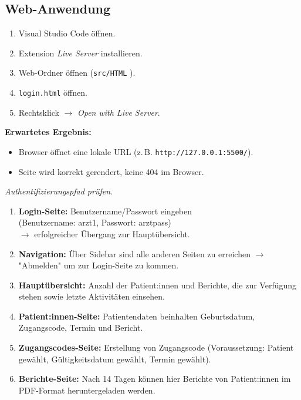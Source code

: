 
\subsection{Web-Anwendung}

\begin{enumerate}
  \item Visual Studio Code öffnen.
  \item Extension \emph{Live Server} installieren.
  \item Web-Ordner öffnen (\texttt{src/HTML} ).
  \item \texttt{login.html} öffnen.
  \item Rechtsklick $\rightarrow$ \emph{Open with Live Server}.
\end{enumerate}

\textbf{Erwartetes Ergebnis:}
\begin{itemize}
  \item Browser öffnet eine lokale URL (z.\,B. \texttt{http://127.0.0.1:5500/}).
  \item Seite wird korrekt gerendert, keine 404 im Browser.
\end{itemize}

\smallskip

\textit{Authentifizierungspfad prüfen.}

\begin{enumerate}
  \item \textbf{Login-Seite:} Benutzername/Passwort eingeben 
  \\ (Benutzername: arzt1, Passwort: arztpass) 
  \\ $\rightarrow$ erfolgreicher Übergang zur Hauptübersicht.
  \item \textbf{Navigation:} Über Sidebar sind alle anderen Seiten zu erreichen $\rightarrow$ "Abmelden" um zur Login-Seite zu kommen.
  \item \textbf{Hauptübersicht:} Anzahl der Patient:innen und Berichte, die zur Verfügung stehen sowie letzte Aktivitäten einsehen.
  \item \textbf{Patient:innen-Seite:} Patientendaten beinhalten Geburtsdatum, Zugangscode, Termin und Bericht.
  \item \textbf{Zugangscodes-Seite:} Erstellung von Zugangscode (Voraussetzung: Patient gewählt, Gültigkeitsdatum gewählt, Termin gewählt).
  \item \textbf{Berichte-Seite:} Nach 14 Tagen können hier Berichte von Patient:innen im PDF-Format heruntergeladen werden.
\end{enumerate}
\newpage

